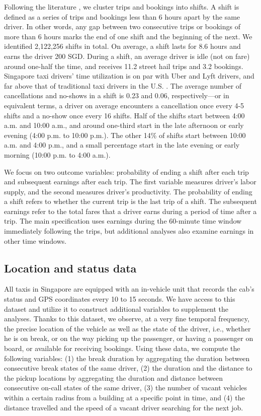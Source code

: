 \documentclass[reviewmode,AEJ]{AEA}
\begin{document}
Following the literature \citep{farber2015you,agarwal2015singaporean,martin2017quit,chen2015dynamic}, we 
cluster trips and bookings into shifts. A shift is defined as a series of trips and bookings less than 6 
hours apart by the same driver. In other words, any gap between two consecutive trips or bookings of more
than 6 hours marks the end of one shift and the beginning of the next. 
We identified 2,122,256 shifts in total. On average, a shift lasts for 8.6 hours and earns the driver 200 SGD. 
During a shift, an average driver is idle (not on fare) around one-half the time, and receives 11.2 street
hail trips and 3.2 bookings.  Singapore taxi drivers' time utilization is on par with Uber and Lyft drivers,
and far above that of traditional taxi drivers in the U.S. \citep{cramer2016disruptive}.
The average number of cancellations and no-shows in a shift is 0.23 and 0.06, respectively---or in equivalent terms,
a driver on average encounters a cancellation once every 4-5 shifts and a no-show once every 16 shifts.
Half of the shifts start between 4:00 a.m. and 10:00 a.m., and around one-third start in the late afternoon 
or early evening (4:00 p.m. to 10:00 p.m.). The other 14\% of shifts start between 10:00 a.m. and 4:00 p.m.,
and a small percentage start in the late evening or early morning (10:00 p.m. to 4:00 a.m.).

We focus on two outcome variables: probability of ending a shift after each trip and subsequent earnings after each trip. The first variable measures driver's labor supply, and the second measures driver's productivity. The probability of ending a shift refers to whether the current trip is the last trip of a shift. The subsequent earnings refer to the total fares that a driver earns during a period of time after a trip. The main specification uses earnings during the 60-minute time window immediately following the trips, but additional analyses also examine earnings in other time windows. 

\subsection{Location and status data}
All taxis in Singapore are equipped with an in-vehicle unit that records the cab's status and GPS 
coordinates every 10 to 15 seconds. We have access to this dataset and utilize it to construct additional variables to supplement the analyses. Thanks to this dataset, we observe, at a very fine temporal frequency, the precise location of the vehicle as well as the state of the driver, i.e., whether he is on break, or on the way picking up the passenger, or having a passenger on board, or available for receiving bookings. Using these data, we compute the following variables: (1) the break duration by aggregating the duration between consecutive break states of the same driver, (2) the duration and  the distance to the pickup locations by aggregating the duration and distance between consecutive on-call states of the same driver, (3) the number of vacant vehicles within a certain radius from a building at a specific point in time, and (4) the distance travelled and the speed of a vacant driver searching for the next job. 
\end{document}
